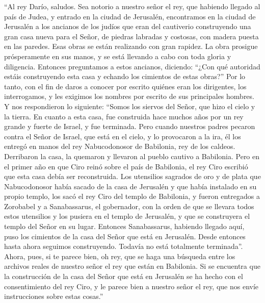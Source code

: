  ``Al rey Darío, saludos. Sea notorio a nuestro señor el
rey, que habiendo llegado al país de Judea, y entrado en la ciudad de
Jerusalén, encontramos en la ciudad de Jerusalén a los ancianos de los
judíos que eran del cautiverio  construyendo una gran casa
nueva para el Señor, de piedras labradas y costosas, con madera puesta
en las paredes.  Esas obras se están realizando con gran
rapidez. La obra prosigue prósperamente en sus manos, y se está llevando
a cabo con toda gloria y diligencia.  Entonces
preguntamos a estos ancianos, diciendo: ``¿Con qué autoridad estáis
construyendo esta casa y echando los cimientos de estas obras?''
 Por lo tanto, con el fin de daros a conocer por escrito
quiénes eran los dirigentes, los interrogamos, y les exigimos los
nombres por escrito de sus principales hombres.  Y nos
respondieron lo siguiente: ``Somos los siervos del Señor, que hizo el
cielo y la tierra.  En cuanto a esta casa, fue construida
hace muchos años por un rey grande y fuerte de Israel, y fue terminada.
 Pero cuando nuestros padres pecaron contra el Señor de
Israel, que está en el cielo, y lo provocaron a la ira, él los entregó
en manos del rey Nabucodonosor de Babilonia, rey de los caldeos.
 Derribaron la casa, la quemaron y llevaron al pueblo
cautivo a Babilonia.  Pero en el primer año en que Ciro
reinó sobre el país de Babilonia, el rey Ciro escribió que esta casa
debía ser reconstruida.  Los utensilios sagrados de oro y
de plata que Nabucodonosor había sacado de la casa de Jerusalén y que
había instalado en su propio templo, los sacó el rey Ciro del templo de
Babilonia, y fueron entregados a Zorobabel y a Sanabassarus, el
gobernador,  con la orden de que se llevara todos estos
utensilios y los pusiera en el templo de Jerusalén, y que se construyera
el templo del Señor en su lugar.  Entonces Sanabassarus,
habiendo llegado aquí, puso los cimientos de la casa del Señor que está
en Jerusalén. Desde entonces hasta ahora seguimos construyendo. Todavía
no está totalmente terminada''.  Ahora, pues, si te
parece bien, oh rey, que se haga una búsqueda entre los archivos reales
de nuestro señor el rey que están en Babilonia.  Si se
encuentra que la construcción de la casa del Señor que está en Jerusalén
se ha hecho con el consentimiento del rey Ciro, y le parece bien a
nuestro señor el rey, que nos envíe instrucciones sobre estas cosas.''

